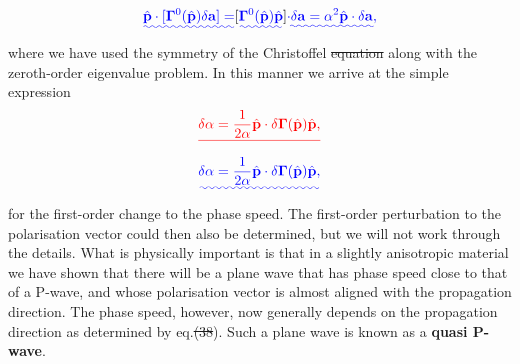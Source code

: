 \documentclass [a4paper,12pt]{paper}
\providecommand{\DIFadd}[1]{{\protect\color{blue}\uwave{#1}}} %
\providecommand{\DIFdel}[1]{{\protect\color{red}\sout{#1}}}                      %
\providecommand{\DIFaddbegin}{} %
\providecommand{\DIFaddend}{} %
\providecommand{\DIFdelbegin}{} %
\providecommand{\DIFdelend}{} %
\begin{document}
\DIFdelend \DIFaddbegin \begin{equation}
\DIFadd{\hat{\mathbf{p}}\cdot[\bm{\Gamma}^{0}(\hat{\mathbf{p}})\delta \mathbf{a}]=}[\DIFadd{\bm{\Gamma}^{0}(\hat{\mathbf{p}})\hat{\mathbf{p}}}]\DIFadd{\cdot\delta
 \mathbf{a}=\alpha^{2}\hat{\mathbf{p}}\cdot\delta \mathbf{a}, 
\label{eq:37}
}\end{equation}\DIFaddend 
where we have used the symmetry of the Christoffel \DIFdelbegin \DIFdel{equation }\DIFdelend \DIFaddbegin \DIFadd{matrix }\DIFaddend along with the zeroth-order eigenvalue problem. In this manner we 
arrive at the simple expression
\DIFdelbegin \begin{displaymath}
\DIFdel{\delta\alpha=\frac{1}{2\alpha}\hat{\mathbf{p}}\cdot\delta\bm{\Gamma}(\hat{\mathbf{p}})\hat{\mathbf{p}}, 
}\end{displaymath}%
\DIFdelend \DIFaddbegin \begin{equation}
\DIFadd{\delta\alpha=\frac{1}{2\alpha}\hat{\mathbf{p}}\cdot\delta\bm{\Gamma}(\hat{\mathbf{p}})\hat{\mathbf{p}}, 
\label{eq:38}
}\end{equation}\DIFaddend 
for the first-order change to the phase speed. The first-order perturbation to the polarisation vector could then also be determined, 
but we will not work through the details. What is physically important is that in a slightly anisotropic material 
we have shown that there will be a plane wave that has phase speed close to that of a P-wave, and whose polarisation vector is 
almost aligned with the propagation direction. The phase speed, however, now generally depends on the propagation direction as determined 
by eq.\DIFdelbegin \DIFdel{(38}\DIFdelend \DIFaddbegin \DIFadd{~(\ref{eq:38}}\DIFaddend ). Such a plane wave is known as a \textbf{quasi P-wave}.
\end{document}
